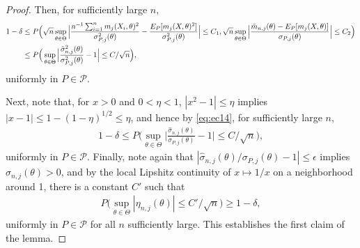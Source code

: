 \documentclass[letterpaper,11pt]{article}
\theoremstyle{myplain}
\theoremstyle{mydefinition}
\theoremstyle{myremark}
\numberwithin{equation}{section}
\numberwithin{figure}{section}
\begin{document}
\begin{appendices}
\begin{proof}
Then, for sufficiently large $n$,
\begin{align}
	1-\delta&\le P\Big(	\sqrt n\sup_{\theta\in\Theta}\Big|\frac{n^{-1}\sum_{i=1}^n m_{j}(X_i,\theta)^2}{\sigma_{P,j}^2(\theta)}-\frac{E_P[m_j(X,\theta)^2]}{\sigma_{P,j}^2(\theta)}\Big|\le C_1,\sqrt n\sup_{\theta\in\Theta}\Big|\frac{\bar m_{n,j}(\theta)-E_P[m_j(X,\theta)]}{\sigma_{P,j}(\theta)}\Big|\le C_2\Big)\notag\\
	&\le P\Big(\sup_{\theta\in\Theta}\Big|\frac{\hat\sigma_{n,j}^2(\theta)}{\sigma_{P,j}^2(\theta)}-1\Big|\le C/\sqrt n\Big), \label{eq:ec14}
\end{align}
uniformly in $P\in\mathcal P.$ 

Next, note that, for $x>0$ and $0<\eta<1$, $|x^2-1|\le \eta$ implies $|x-1|\le 1-(1-\eta)^{1/2}\le\eta$, and hence by \eqref{eq:ec14}, for sufficiently large $n$,
\begin{align}
	1-\delta\le  P\Big(\sup_{\theta\in\Theta}\Big|\frac{\hat\sigma_{n,j}(\theta)}{\sigma_{P,j}(\theta)}-1\Big|\le C/\sqrt n\Big),\label{eq:ec15}
\end{align} 
uniformly in $P\in\mathcal P.$ 
Finally, note again that $|\hat\sigma_{n,j}(\theta)/\sigma_{P,j}(\theta)-1|\le \epsilon$ implies $\hat\sigma_{n,j}(\theta)>0$, and
by the local Lipshitz continuity of $x\mapsto 1/x$ on a neighborhood around 1, there is a constant $C'$ such that
\begin{align}
P\Big(\sup_{\theta\in\Theta}|\eta_{n,j}(\theta)|\le C'/\sqrt n\Big)	\ge 1-\delta,\label{eq:ec16}
\end{align}
uniformly in $P\in\mathcal P$ for all $n$ sufficiently large.
This establishes the first claim of the lemma.	


\end{proof}
\end{appendices}
\end{document}
